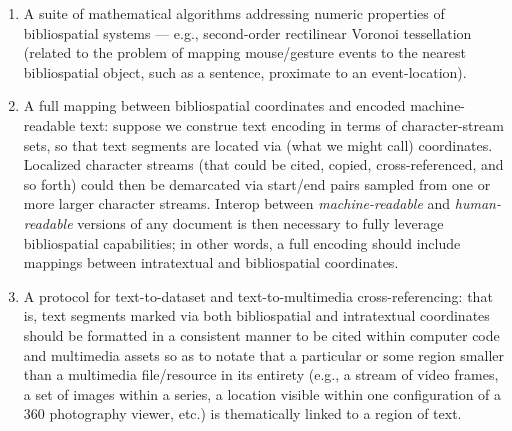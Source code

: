 {\begin{enumerate}[leftmargin=2pt, itemsep=-1pt]
\item{} A suite of mathematical algorithms addressing numeric 
properties of bibliospatial systems --- e.g., second-order 
rectilinear Voronoi tessellation (related to the problem 
of mapping mouse/gesture events to the nearest bibliospatial object, 
such as a sentence, proximate to an event-location). 

\item{} A full mapping between bibliospatial coordinates and encoded 
machine-readable text: suppose we construe text encoding in terms 
of character-stream sets, so that text segments are located via 
(what we might call)  coordinates.  Localized character 
streams (that could be cited, copied, cross-referenced, and so forth) 
could then be demarcated via start/end pairs sampled from one or 
more larger character streams.  Interop between \textit{machine-readable} 
and \textit{human-readable} versions of any document is then necessary 
to fully leverage bibliospatial capabilities; in other 
words, a full encoding should include mappings between 
intratextual and bibliospatial coordinates.  

\item{} A protocol for text-to-dataset and text-to-multimedia 
cross-referencing: that is, text segments marked via both 
bibliospatial and intratextual coordinates should be 
formatted in a consistent manner to be cited within computer 
code and multimedia assets so as to notate that a particular 
 or some region smaller than a multimedia file/resource 
in its entirety (e.g., a stream of video frames, a set of 
images within a series, a location visible within one configuration 
of a 360\textdegree{} photography viewer, etc.) is thematically 
linked to a region of text.   

\end{enumerate}
}

